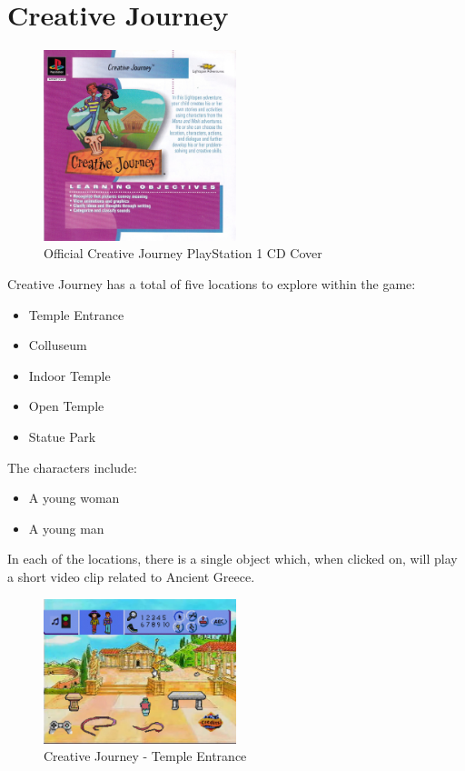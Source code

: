 \chapter{Creative Journey}

\begin{figure}[H]
    \centering
    \includegraphics[width=0.5\textwidth]{"./Games/Creative/Images/CreativeJourneyCDCover.jpg"}
    \caption{Official Creative Journey PlayStation 1 CD Cover}
\end{figure}

Creative Journey has a total of five locations to explore within the game:

\begin{itemize}
    \item Temple Entrance
    \item Colluseum
    \item Indoor Temple
    \item Open Temple
    \item Statue Park
\end{itemize}

The characters include:
\begin{itemize}
    \item A young woman
    \item A young man
\end{itemize}

In each of the locations, there is a single object which, when clicked on, will play a short video clip related to Ancient Greece.

\begin{figure}[H]
    \centering
    \includegraphics[width=0.5\textwidth]{"./Games/Creative/Images/CreativeJourneyScreenshot1.jpg"}
    \caption{Creative Journey - Temple Entrance}
\end{figure}


